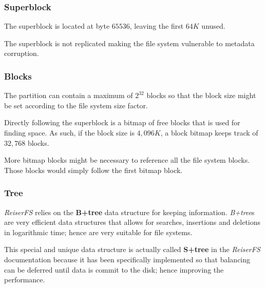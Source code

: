 
\begin{frame}
  \frametitle{Superblock}

  The superblock is located at byte $65536$, leaving the first $64K$ unused.

  \-

  The superblock is not replicated making the file system vulnerable to
  metadata corruption.
\end{frame}


\begin{frame}
  \frametitle{Blocks}

  The partition can contain a maximum of $2^{32}$ blocks so that the
  block size might be set according to the file system size factor.

  \-

  Directly following the superblock is a bitmap of free blocks that is used
  for finding space. As such, if the block size is $4,096K$, a block bitmap
  keeps track of $32,768$ blocks.

  \-

  More bitmap blocks might be necessary to reference all the file system
  blocks. Those blocks would simply follow the first bitmap block.
\end{frame}


\begin{frame}
  \frametitle{Tree}

  \textit{ReiserFS} relies on the \textbf{B+tree} data structure for keeping
  information. \textit{B+tree}s are very efficient data structures that allows
  for searches, insertions and deletions in logarithmic time; hence are very
  suitable for file systems.

  \-

  This special and unique data structure is actually called \textbf{S+tree}
  in the \textit{ReiserFS} documentation because it has been specifically
  implemented so that balancing can be deferred until data is commit to the
  disk; hence improving the performance.
\end{frame}


